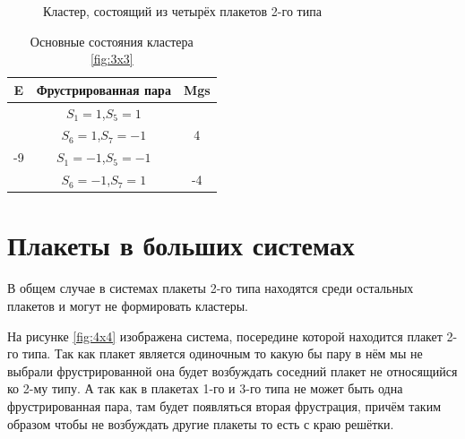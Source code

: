 \documentclass[utf8, babel, sor, jor, amsmath, amssymb, reprint]{elsarticle} %
\begin{document}
\begin{figure}[H]
	\centering
	\caption{Кластер, состоящий из четырёх плакетов 2-го типа}
	\label{fig:cl}
\end{figure}


\begin{table}[H]
	\centering
	\begin{tabular}{|c|c|c|}
		\hline
		E   &   Фрустрированная пара & Mgs\\
		\hline
		&  $S_1=1$,$S_5=1$&\\
		&    $S_6=1$,$S_7=-1$ & 4\\
		\cline{2-3}
		-9	\multirow{3}{*}{}
		&  $S_1=-1$,$S_5=-1$&\\
		&    $S_6=-1$,$S_7=1$ & -4\\
		\hline
	\end{tabular}
	\caption{Основные состояния кластера \ref{fig:3x3}}
	\label{tab:gscl}
\end{table} 

\section{Плакеты в больших системах}

В общем случае в системах плакеты 2-го типа находятся среди остальных плакетов и могут не формировать кластеры.

На рисунке \ref{fig:4x4} изображена система, посередине которой находится плакет 2-го типа. Так как плакет является одиночным то какую бы пару в нём мы не выбрали фрустрированной она будет возбуждать соседний плакет не относящийся ко 2-му типу. А так как в плакетах 1-го и 3-го типа не может быть одна фрустрированная пара, там будет появляться вторая фрустрация, причём таким образом чтобы не возбуждать другие плакеты то есть с краю решётки.
\end{document}
